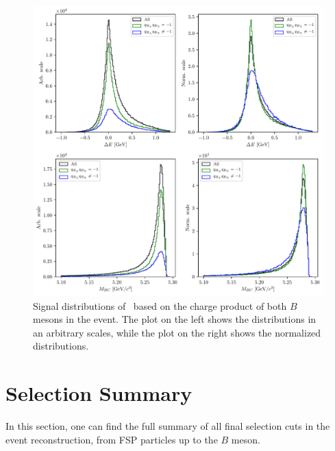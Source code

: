 \begin{figure}[!htb]
	\centering
	\captionsetup{width=0.8\linewidth}
	\includegraphics[width=\linewidth]{fig/sig_categ}
	\caption{Signal distributions of \vars~based on the charge product of both $B$ mesons in the event. The plot on the left shows the distributions in an arbitrary scales, while the plot on the right shows the normalized distributions.}
	\label{fig:sig_categ}
\end{figure}

\section{Selection Summary}
\label{s:ss}
In this section, one can find the full summary of all final selection cuts in the event reconstruction, from FSP particles up to the $B$ meson.


